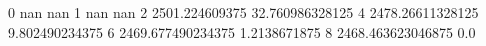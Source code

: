0 nan nan
1 nan nan
2 2501.224609375 32.760986328125
4 2478.26611328125 9.802490234375
6 2469.677490234375 1.2138671875
8 2468.463623046875 0.0

